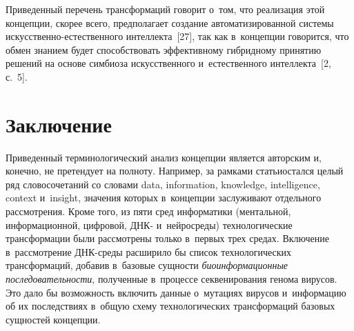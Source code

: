\begin{multicols}{2}
Приведенный перечень трансформаций говорит о~том, что реализация этой 
концепции, \mbox{скорее} всего, предполагает создание автоматизированной системы  
ис\-кусст\-вен\-но-ес\-тест\-вен\-но\-го интеллекта~[27], так как в~концепции 
говорится, что обмен знанием будет способствовать эффективному гибридному 
принятию решений на основе симбиоза искусственного и~естественного 
интеллекта~[2, с.~5].

\vspace*{-9pt}

\section{Заключение} %

\vspace*{-3pt}

Приведенный терминологический анализ концепции является авторским и, 
конечно, не претендует на полноту. Например, за рамками \mbox{статьи}\linebreak остался целый 
ряд словосочетаний со словами data, information, knowledge, intelligence, context 
и~insight, значения которых в~концепции заслуживают отдельного рассмотрения. 
Кроме того, из \mbox{пяти} сред информатики (ментальной, информационной, циф\-ро\-вой, 
ДНК- и~нейросреды) технологические трансформации были рас\-смот\-ре\-ны только 
в~первых трех средах. Включение в~рассмотрение ДНК-сре\-ды расширило бы 
список технологических трансформаций, добавив в~базовые сущности 
\textit{биоинформационные последовательности}, полученные в~процессе 
секвенирования генома вирусов. Это дало бы возможность включить данные 
о~мутациях вирусов и~информацию об их последствиях в~общую схему 
технологических трансформаций базовых сущностей концепции.

  \vspace*{-9pt}
  
  
{\small\frenchspacing
 {\baselineskip=10.75pt
 \begin{thebibliography}{99}
 
 \vspace*{-3pt}


\end{thebibliography}}}
\end{multicols}
